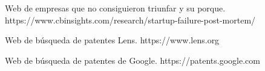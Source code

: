 % 

\begin{thebibliography}{99}

\emph{} Web de empresas que no consiguieron triunfar y su porque. https://www.cbinsights.com/research/startup-failure-post-mortem/

\emph{} Web de búsqueda de patentes Lens. https://www.lens.org

\emph{} Web de búsqueda de patentes de Google. https://patents.google.com
\end{thebibliography}
